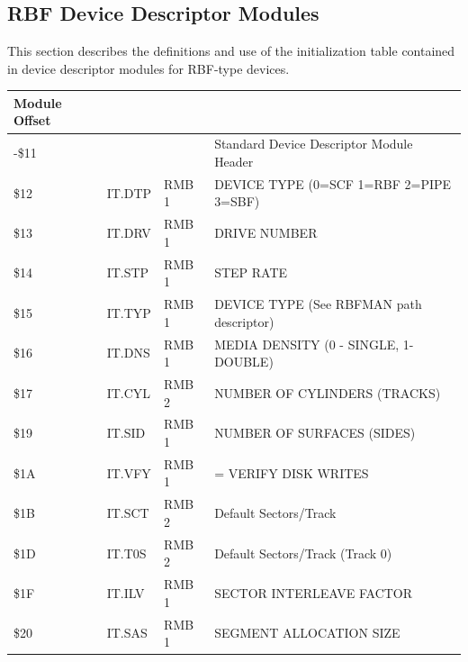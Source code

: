 \documentclass[
]{article}
\newcounter{none} %
\begin{document}
\subsection{RBF Device Descriptor Modules}

This section describes the definitions and use of the initialization
table contained in device descriptor modules for RBF-type devices.

{\def\LTcaptype{none} %
\begin{longtable}[]{@{}
  >{\raggedright\arraybackslash}p{}
  >{\raggedright\arraybackslash}p{}
  >{\raggedright\arraybackslash}p{}
  >{\raggedright\arraybackslash}p{}@{}}
\toprule\noalign{}
\begin{minipage}[b]{\linewidth}\raggedright
Module Offset
\end{minipage} & \begin{minipage}[b]{\linewidth}\raggedright
\end{minipage} & \begin{minipage}[b]{\linewidth}\raggedright
\end{minipage} & \begin{minipage}[b]{\linewidth}\raggedright
\end{minipage} \\
\midrule\noalign{}
\endhead
\bottomrule\noalign{}
\endlastfoot
0-\$11 & & & Standard Device Descriptor Module Header \\
\$12 & IT.DTP & RMB 1 & DEVICE TYPE (0=SCF 1=RBF 2=PIPE 3=SBF) \\
\$13 & IT.DRV & RMB 1 & DRIVE NUMBER \\
\$14 & IT.STP & RMB 1 & STEP RATE \\
\$15 & IT.TYP & RMB 1 & DEVICE TYPE (See RBFMAN path descriptor) \\
\$16 & IT.DNS & RMB 1 & MEDIA DENSITY (0 - SINGLE, 1-DOUBLE) \\
\$17 & IT.CYL & RMB 2 & NUMBER OF CYLINDERS (TRACKS) \\
\$19 & IT.SID & RMB 1 & NUMBER OF SURFACES (SIDES) \\
\$1A & IT.VFY & RMB 1 & 0 = VERIFY DISK WRITES \\
\$1B & IT.SCT & RMB 2 & Default Sectors/Track \\
\$1D & IT.T0S & RMB 2 & Default Sectors/Track (Track 0) \\
\$1F & IT.ILV & RMB 1 & SECTOR INTERLEAVE FACTOR \\
\$20 & IT.SAS & RMB 1 & SEGMENT ALLOCATION SIZE \\
\end{longtable}
}
\end{document}
